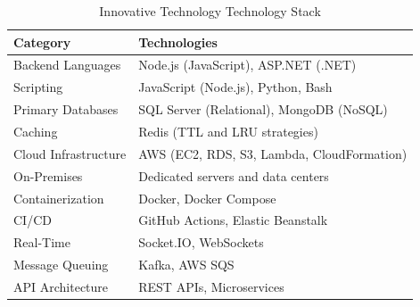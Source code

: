 \begin{table}[h]
    \centering
    \begin{tabularx}{\textwidth}{|l|X|}
        \hline
        \textbf{Category} & \textbf{Technologies} \\
        \hline
        Backend Languages & Node.js (JavaScript), ASP.NET (.NET) \\
        \hline
        Scripting & JavaScript (Node.js), Python, Bash \\
        \hline
        Primary Databases & SQL Server (Relational), MongoDB (NoSQL) \\
        \hline
        Caching & Redis (TTL and LRU strategies) \\
        \hline
        Cloud Infrastructure & AWS (EC2, RDS, S3, Lambda, CloudFormation) \\
        \hline
        On-Premises & Dedicated servers and data centers \\
        \hline
        Containerization & Docker, Docker Compose \\
        \hline
        CI/CD & GitHub Actions, Elastic Beanstalk \\
        \hline
        Real-Time & Socket.IO, WebSockets \\
        \hline
        Message Queuing & Kafka, AWS SQS \\
        \hline
        API Architecture & REST APIs, Microservices \\
        \hline
    \end{tabularx}
    \caption{Innovative Technology Technology Stack}
\end{table}



